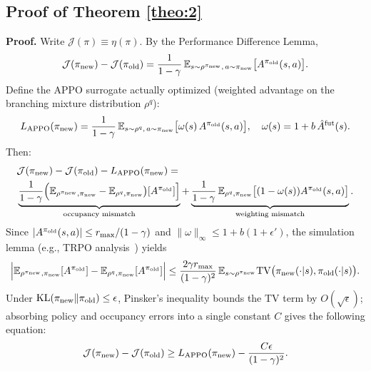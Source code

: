 \documentclass{article}
\begin{document}
\subsection{Proof of Theorem \ref{theo:2}}
\label{proof:theorem2}
\textbf{Proof.}
Write $\mathcal{J}(\pi)\equiv\eta(\pi)$. By the Performance Difference Lemma,
\begin{equation}\label{eq:pdl2}
\mathcal{J}(\pi_{\rm new})-\mathcal{J}(\pi_{\rm old})
=\frac{1}{1-\gamma}\,
\mathbb{E}_{s\sim\rho^{\pi_{\rm new}},\,a\sim\pi_{\rm new}}
\big[A^{\pi_{\rm old}}(s,a)\big].
\end{equation}
Define the APPO surrogate actually optimized (weighted advantage on the
branching mixture distribution $\rho^q$):
\begin{equation}
L_{\rm APPO}(\pi_{\rm new})
=\frac{1}{1-\gamma}\,
\mathbb{E}_{s\sim\rho^{q},\,a\sim\pi_{\rm new}}
\big[\omega(s)\,A^{\pi_{\rm old}}(s,a)\big],
\quad \omega(s)=1+b\,\hat{A}^{\rm fut}(s).
\end{equation}
Then:
\begin{equation}\label{eq:x}
\begin{split}
   & \mathcal{J}(\pi_{\rm new})-\mathcal{J}(\pi_{\rm old})-L_{\rm APPO}(\pi_{\rm new})
= \\
&\underbrace{\frac{1}{1-\gamma}\Big(
\mathbb{E}_{\rho^{\pi_{\rm new}},\pi_{\rm new}}-\mathbb{E}_{\rho^{q},\pi_{\rm new}}
\big)[A^{\pi_{\rm old}}]\Big]}_{\text{occupancy mismatch}}
+\underbrace{\frac{1}{1-\gamma}\,
\mathbb{E}_{\rho^{q},\pi_{\rm new}}
\big[(1-\omega(s))A^{\pi_{\rm old}}(s,a)\big]}_{\text{weighting mismatch}}.
\end{split} 
\end{equation}
Since $|A^{\pi_{\rm old}}(s,a)|\le r_{\max}/(1-\gamma)$ and
$\|\omega\|_\infty\le 1+b(1+\epsilon')$, the simulation lemma
(e.g., TRPO analysis~\cite{schulman2017proximal,agarwal2019reinforcement}) yields
\begin{equation}
\Big|\mathbb{E}_{\rho^{\pi_{\rm new}},\pi_{\rm new}}[A^{\pi_{\rm old}}]
-\mathbb{E}_{\rho^{q},\pi_{\rm new}}[A^{\pi_{\rm old}}]\Big|
\le \frac{2\gamma r_{\max}}{(1-\gamma)^2}\,
\mathbb{E}_{s\sim\rho^{\pi_{\rm new}}}
\mathrm{TV}\big(\pi_{\rm new}(\cdot|s),\pi_{\rm old}(\cdot|s)\big).
\end{equation}
Under $\mathrm{KL}(\pi_{\rm new}\|\pi_{\rm old})\le\epsilon$,
Pinsker's inequality bounds the TV term by $O(\sqrt{\epsilon})$;
absorbing policy and occupancy errors into a single constant $C$ gives the following equation:
\begin{equation}
\mathcal{J}(\pi_{\rm new})-\mathcal{J}(\pi_{\rm old})
\ge L_{\rm APPO}(\pi_{\rm new})
-\frac{C\epsilon}{(1-\gamma)^2}.
\end{equation} 
 
\end{document}
